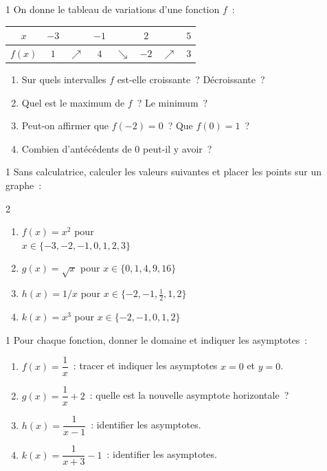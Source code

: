 \begin{exo}{1}
On donne le tableau de variations d'une fonction $f$~:
\begin{center}
\renewcommand{\arraystretch}{1.8}
\begin{tabular}{|c|ccccccc|}
\hline
$x$ & $-3$ & & $-1$ & & $2$ & & $5$ \\
\hline
$f(x)$ & $1$ & $\nearrow$ & $4$ & $\searrow$ & $-2$ & $\nearrow$ & $3$ \\
\hline
\end{tabular}
\end{center}
\begin{enumerate}
  \item Sur quels intervalles $f$ est-elle croissante~? D\'ecroissante~?
  \item Quel est le maximum de $f$~? Le minimum~?
  \item Peut-on affirmer que $f(-2)=0$~? Que $f(0)=1$~?
  \item Combien d'ant\'ec\'edents de $0$ peut-il y avoir~?
\end{enumerate}
\end{exo}

\begin{exo}{1}
Sans calculatrice, calculer les valeurs suivantes et placer les points
sur un graphe~:
\begin{multicols}{2}
\begin{enumerate}
  \item $f(x)=x^2$ pour\\ $x\in\{-3,-2,-1,0,1,2,3\}$
  \item $g(x)=\sqrt{x}$ pour $x\in\{0,1,4,9,16\}$
  \item $h(x)=1/x$ pour $x\in\{-2,-1,\frac{1}{2},1,2\}$
  \item $k(x)=x^3$ pour $x\in\{-2,-1,0,1,2\}$
\end{enumerate}
\end{multicols}
\end{exo}

\begin{exo}{1}
Pour chaque fonction, donner le domaine et indiquer les asymptotes~:
\begin{enumerate}
  \item $f(x) = \dfrac{1}{x}$~: tracer et indiquer les asymptotes $x=0$ et $y=0$.
  \item $g(x) = \dfrac{1}{x} + 2$~: quelle est la nouvelle asymptote horizontale~?
  \item $h(x) = \dfrac{1}{x-1}$~: identifier les asymptotes.
  \item $k(x) = \dfrac{1}{x+3} - 1$~: identifier les asymptotes.
\end{enumerate}
\end{exo}


